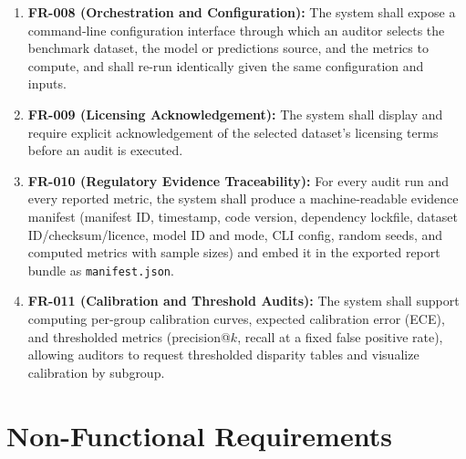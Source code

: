 \begin{enumerate}
    \item \textbf{FR-008 (Orchestration and Configuration):} The system shall expose a command-line configuration interface through which an auditor selects the benchmark dataset, the model or predictions source, and the metrics to compute, and shall re-run identically given the same configuration and inputs.
    \item \textbf{FR-009 (Licensing Acknowledgement):} The system shall display and require explicit acknowledgement of the selected dataset's licensing terms before an audit is executed.
    \item \textbf{FR-010 (Regulatory Evidence Traceability):} For every audit run and every reported metric, the system shall produce a machine-readable evidence manifest (manifest ID, timestamp, code version, dependency lockfile, dataset ID/checksum/licence, model ID and mode, CLI config, random seeds, and computed metrics with sample sizes) and embed it in the exported report bundle as \texttt{manifest.json}.
    \item \textbf{FR-011 (Calibration and Threshold Audits):} The system shall support computing per-group calibration curves, expected calibration error (ECE), and thresholded metrics (precision@\(k\), recall at a fixed false positive rate), allowing auditors to request thresholded disparity tables and visualize calibration by subgroup.
\end{enumerate}

\section{Non-Functional Requirements}

